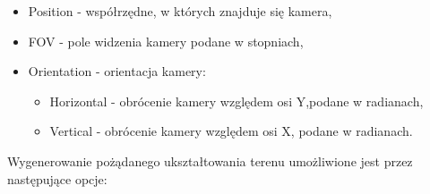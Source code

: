 \begin{itemize}
\item Position - współrzędne, w których znajduje się kamera,
\item FOV - pole widzenia kamery podane w stopniach,
\item Orientation - orientacja kamery:
  \begin{itemize}
    \item Horizontal - obrócenie kamery względem osi Y,podane w radianach,
    \item Vertical - obrócenie kamery względem osi X, podane w radianach.
  \end{itemize}
\end{itemize}

Wygenerowanie pożądanego ukształtowania terenu umożliwione jest przez następujące opcje:


